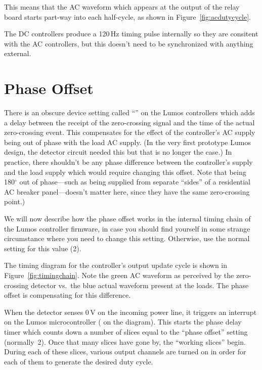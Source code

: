 \documentclass[letterpaper,twoside,onecolumn,openright,final]{memoir}
\begin{document}
This means that the AC waveform which appears at the output of the relay board starts part-way
into each half-cycle, as shown in Figure~\ref{fig:acdutycycle}.


The DC controllers produce a 120\,Hz timing pulse internally so they are consitent with the
AC controllers, but this doesn't need to be synchronized with anything external.

\section{Phase Offset}
There is an obscure device setting called ``'' on the Lumos controllers which adds a
delay between the receipt of the zero-crossing signal and the time of the actual zero-crossing
event.  This compensates for the effect of the controller's AC supply being out of phase with the
load AC supply.  (In the very first prototype Lumos design, the detector circuit needed this but
that is no longer the case.)  
In practice, there shouldn't be any phase difference between the controller's
supply and the load supply which would require changing this offset.  Note that being 180$^\circ$
out of phase---such as being supplied from separate ``sides'' of a residential AC breaker panel---doesn't 
matter here, since they have the same zero-crossing point.)

We will now describe how the phase offset works in the internal timing chain of the Lumos
controller firmware, in case you should find yourself in some strange circumstance where you need
to change this setting.  Otherwise, use the normal setting for this value (2).

The timing diagram for the controller's output update cycle is shown in Figure~\ref{fig:timingchain}.
Note the green AC waveform as perceived by the zero-crossing detector vs.\ the blue actual waveform
present at the loads.  The phase offset is compensating for this difference.


When the  detector senses 0\,V on the incoming power line, it triggers an interrupt
on the Lumos microcontroller ( on the diagram).  This starts the phase delay timer which
counts down a number of slices equal to the ``phase offset'' setting (normally~2).  Once that many
slices have gone by, the ``working slices'' begin.  During each of these slices, various output
channels are turned on in order for each of them to generate the desired 
duty cycle.
\end{document}

